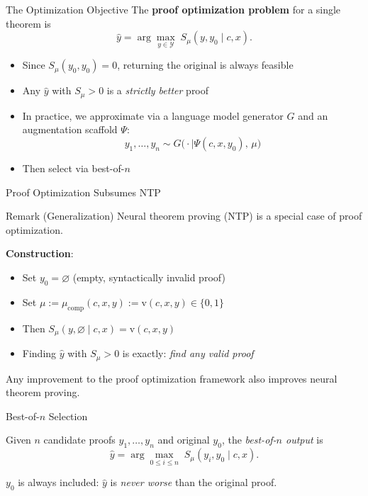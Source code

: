 \documentclass{beamer}
\begin{document}
\begin{frame}{The Optimization Objective}
\vspace{0.5em}
The \textbf{proof optimization problem} for a single theorem is
\[
  \hat{y} = \arg\max_{y \in \mathcal{Y}}\; S_\mu(y, y_0 \mid c, x).
\]
\vspace{0.5em}
\begin{itemize}\setlength{\itemsep}{8pt}
  \item Since $S_\mu(y_0, y_0) = 0$, returning the original is always feasible
  \item Any $\hat{y}$ with $S_\mu > 0$ is a \emph{strictly better} proof
  \item In practice, we approximate via a language model generator $G$ and an augmentation scaffold $\Psi$:
    \[y_1,\dots,y_n \sim G\bigl(\cdot \mid \Psi(c,x,y_0),\, \mu\bigr)\]
  \item Then select via best-of-$n$
\end{itemize}
\end{frame}

\begin{frame}{Proof Optimization Subsumes NTP}
\vspace{0.4em}
\begin{block}{Remark (Generalization)}
Neural theorem proving (NTP) is a special case of proof optimization.
\end{block}
\vspace{0.4em}
\textbf{Construction}:
\begin{itemize}\setlength{\itemsep}{6pt}
  \item Set $y_0 = \varnothing$ (empty, syntactically invalid proof)
  \item Set $\mu := \mu_{\mathrm{comp}}(c,x,y) := \mathrm{v}(c,x,y) \in \{0,1\}$
  \item Then $S_\mu(y, \varnothing \mid c, x) = \mathrm{v}(c,x,y)$
  \item Finding $\hat{y}$ with $S_\mu > 0$ is exactly: \emph{find any valid proof}
\end{itemize}
\vspace{0.4em}
\begin{exampleblock}{}
  \centering Any improvement to the proof optimization framework also improves neural theorem proving.
\end{exampleblock}
\end{frame}

\begin{frame}{Best-of-$n$ Selection}
\vspace{0.6em}
\begin{definition}[Best-of-$n$]
Given $n$ candidate proofs $y_1,\dots,y_n$ and original $y_0$, the \emph{best-of-$n$ output} is
\[
  \hat{y} = \arg\max_{0 \le i \le n}\; S_\mu(y_i, y_0 \mid c, x).
\]
\end{definition}
\vspace{0.8em}
\begin{exampleblock}{}
  $y_0$ is always included: $\hat{y}$ is \emph{never worse} than the original proof.
\end{exampleblock}
\end{frame}
\end{document}
